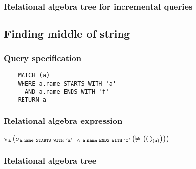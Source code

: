 	\subsubsection*{Relational algebra tree for incremental queries}

	\subsection{Finding middle of string}

	\subsubsection*{Query specification}

	\begin{lstlisting}
	MATCH (a)
	WHERE a.name STARTS WITH 'a'
	  AND a.name ENDS WITH 'f'
	RETURN a
	\end{lstlisting}


	\subsubsection*{Relational algebra expression}

	$\projection{\var{a}} \left(\selection{\mathtt{a.name~STARTS~WITH~'a'
	~~\land~a.name~ENDS~WITH~'f'}} \left(\alldifferent{} \left(\getvertices{a}{}\right)\right)\right)$

	\subsubsection*{Relational algebra tree}


